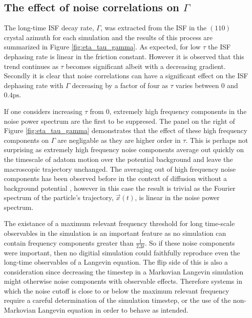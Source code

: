 \documentclass{article}
\newcommand{\ps}{\si{\pico\second}}
\begin{document}
\subsection{The effect of noise correlations on $\Gamma$}

The long-time ISF decay rate, $\Gamma$, was extracted from the ISF in the $(110)$ crystal azimuth for each simulation and the results of this process are summarized in Figure \ref{fig:eta_tau_gamma}. As expected, for low $\tau$ the ISF dephasing rate is linear in the friction constant. However it is observed that this trend continues as $\tau$ becomes significant albeit with a decreasing gradient. Secondly it is clear that noise correlations can have a significant effect on the ISF dephasing rate with $\Gamma$ decreasing by a factor of four as $\tau$ varies between $0$ and $0.4\ps$.

If one considers increasing $\tau$ from $0$, extremely high frequency components in the noise power spectrum are the first to be suppresed. The panel on the right of Figure \ref{fig:eta_tau_gamma} demonstrates that the effect of these high frequency components on $\Gamma$ are negligable as they are higher order in $\tau$. This is perhaps not surprising as extremely high frequency noise components average out quickly on the timescale of adatom motion over the potential background and leave the macroscopic trajectory unchanged. The averaging out of high frequency noise components has been observed before in the context of diffusion without a background potential \cite{Townsend}, however in this case the result is trivial as the Fourier spectrum of the particle's trajectory, $\vec{x}(t)$, is linear in the noise power spectrum. 

The existance of a maximum relevant frequency threshold for long time-scale observables in the simulation is an important feature as no simulation can contain frequency components greater than $\frac{1}{2\Delta{t}}$. So if these noise components were important, then no digitial simulation could faithfully reproduce even the long-time observables of a Langevin equation. The flip side of this is also a consideration since decreasing the timestep in a Markovian Langevin simulation might otherwise noise components with observable effects. Therefore systems in which the noise cutoff is close to or below the maximum relevant frequency require a careful determination of the simulation timestep, or the use of the non-Markovian Langevin equation in order to behave as intended.
\end{document}
